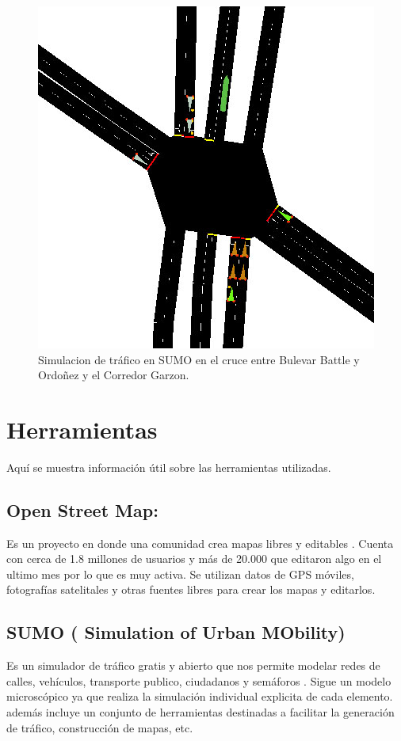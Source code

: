 \begin{figure}[h]
	\centering
	\includegraphics[width=0.7\linewidth]{Figures/sim1}
	\caption{Simulacion de tráfico en SUMO en el cruce entre Bulevar Battle y Ordoñez y el Corredor Garzon.}
	\label{fig:sim1}
\end{figure}




\section{Herramientas}
Aquí se muestra información útil sobre las herramientas utilizadas.

\subsection{Open Street Map:} 
 Es un proyecto en donde una comunidad crea mapas libres y editables \citep{OSM}. Cuenta con cerca de 1.8 millones de usuarios  y  más de 20.000 que editaron algo en el ultimo mes \citep{OSMSTATS} por lo que es muy activa. Se utilizan datos de GPS móviles, fotografías satelitales y otras fuentes libres para crear los mapas y editarlos. 

\subsection{SUMO ( Simulation of Urban MObility)}

Es un simulador de tráfico gratis y abierto que nos permite modelar redes de calles, vehículos, transporte publico, ciudadanos y semáforos \citep{SUMO}. Sigue un modelo microscópico ya que realiza la simulación individual explicita de cada elemento. además incluye un conjunto de herramientas destinadas  a facilitar la generación de tráfico, construcción de mapas, etc. 


